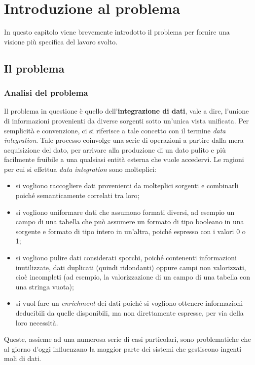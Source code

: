 \chapter{Introduzione al problema}\label{ch:introduzione}

In questo capitolo viene brevemente introdotto il problema per fornire una visione più specifica del lavoro svolto.

\section{Il problema}\label{sec:problem}

\subsection{Analisi del problema}\label{subsec:problem-analysis}
Il problema in questione è quello dell'\textbf{integrazione di dati}, vale a dire, l'unione di informazioni provenienti da diverse sorgenti sotto un'unica vista unificata.
Per semplicità e convenzione, ci si riferisce a tale concetto con il termine \textit{data integration}.
Tale processo coinvolge una serie di operazioni a partire dalla mera acquisizione del dato, per arrivare alla produzione di un dato pulito e più facilmente fruibile a una qualsiasi entità esterna che vuole accedervi.
Le ragioni per cui si effettua \textit{data integration} sono molteplici:
\begin{itemize}
    \item si vogliono raccogliere dati provenienti da molteplici sorgenti e combinarli poiché semanticamente correlati tra loro;
    \item si vogliono uniformare dati che assumono formati diversi, ad esempio un campo di una tabella che può assumere un formato di tipo booleano in una sorgente e formato di tipo intero in un'altra, poiché espresso con i valori 0 o 1;
    \item si vogliono pulire dati considerati sporchi, poiché contenenti informazioni inutilizzate, dati duplicati (quindi ridondanti) oppure campi non valorizzati, cioè incompleti (ad esempio, la valorizzazione di un campo di una tabella con una stringa vuota);
    \item si vuol fare un \textit{enrichment} dei dati poiché si vogliono ottenere informazioni deducibili da quelle disponibili, ma non direttamente espresse, per via della loro necessità.
\end{itemize}
Queste, assieme ad una numerosa serie di casi particolari, sono problematiche che al giorno d'oggi influenzano la maggior parte dei sistemi che gestiscono ingenti moli di dati.

